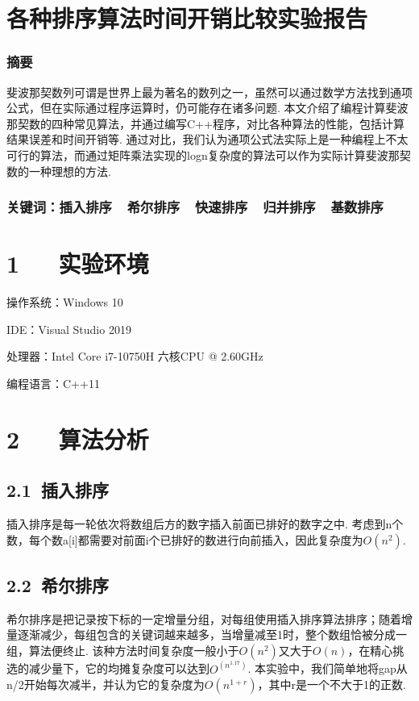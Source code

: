 \documentclass[UTF8]{ctexart}
\begin{document}
\newpage
\section*{各种排序算法时间开销比较实验报告}
\subsubsection*{摘要}
{\kaishu\normalsize  斐波那契数列可谓是世界上最为著名的数列之一，虽然可以通过数学方法找到通项公式，但在实际通过程序运算时，仍可能存在诸多问题. 本文介绍了编程计算斐波那契数的四种常见算法，并通过编写C++程序，对比各种算法的性能，包括计算结果误差和时间开销等. 通过对比，我们认为通项公式法实际上是一种编程上不太可行的算法，而通过矩阵乘法实现的logn复杂度的算法可以作为实际计算斐波那契数的一种理想的方法.}
\subsubsection*{关键词：插入排序\ \ 希尔排序\ \ 快速排序\ \ 归并排序\ \ 基数排序\vspace{1.5em}}

\section*{1\ \ \ 实验环境}
操作系统：Windows 10\par
IDE：Visual Studio 2019\par
处理器：Intel Core i7-10750H 六核CPU @ 2.60GHz\par
编程语言：C++11

\section*{2\ \ \ 算法分析}
\subsection*{2.1\ 插入排序}
插入排序是每一轮依次将数组后方的数字插入前面已排好的数字之中. 考虑到n个数，每个数a[i]都需要对前面i个已排好的数进行向前插入，因此复杂度为$O(n^2)$.
\subsection*{2.2\ 希尔排序}
希尔排序是把记录按下标的一定增量分组，对每组使用插入排序算法排序；随着增量逐渐减少，每组包含的关键词越来越多，当增量减至1时，整个数组恰被分成一组，算法便终止. 该种方法时间复杂度一般小于$O(n^2)$又大于$O(n)$，在精心挑选的减少量下，它的均摊复杂度可以达到$O^(n^1.17)$. 本实验中，我们简单地将gap从n/2开始每次减半，并认为它的复杂度为$O(n^{1+r})$，其中r是一个不大于1的正数.
\end{document}
